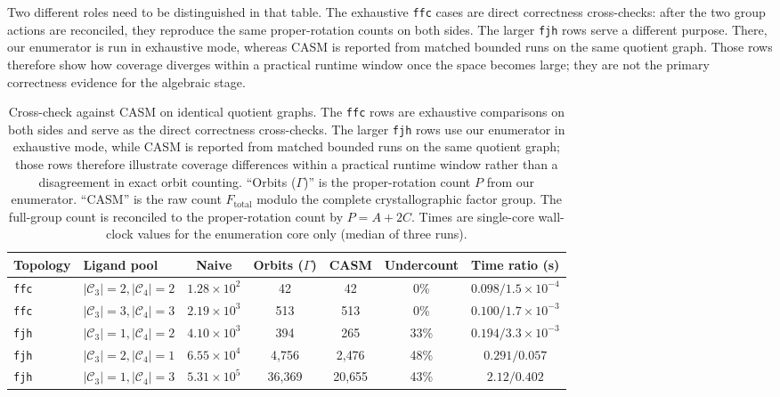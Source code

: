 \documentclass[pdflatex,sn-mathphys-num]{sn-jnl}
\theoremstyle{thmstyleone}%
\begin{document}
Two different roles need to be distinguished in that table. The exhaustive \texttt{ffc} cases are direct correctness cross-checks: after the two group actions are reconciled, they reproduce the same proper-rotation counts on both sides. The larger \texttt{fjh} rows serve a different purpose. There, our enumerator is run in exhaustive mode, whereas CASM is reported from matched bounded runs on the same quotient graph. Those rows therefore show how coverage diverges within a practical runtime window once the space becomes large; they are not the primary correctness evidence for the algebraic stage.

\begin{table}[htbp]
\centering
\scriptsize
\setlength{\tabcolsep}{1.0mm}
\renewcommand{\arraystretch}{1.2}
\caption{Cross-check against CASM on identical quotient graphs. The \texttt{ffc} rows are exhaustive comparisons on both sides and serve as the direct correctness cross-checks. The larger \texttt{fjh} rows use our enumerator in exhaustive mode, while CASM is reported from matched bounded runs on the same quotient graph; those rows therefore illustrate coverage differences within a practical runtime window rather than a disagreement in exact orbit counting. ``Orbits ($\Gamma$)'' is the proper-rotation count $P$ from our enumerator. ``CASM'' is the raw count $F_{\mathrm{total}}$ modulo the complete crystallographic factor group. The full-group count is reconciled to the proper-rotation count by $P=A+2C$. Times are single-core wall-clock values for the enumeration core only (median of three runs).}
\label{tab:casm}
\begin{tabular}{llccccc}
\toprule
\textbf{Topology} & \textbf{Ligand pool} & \textbf{Naive} & \textbf{Orbits ($\Gamma$)} & \textbf{CASM} & \textbf{Undercount} & \textbf{Time ratio (s)} \\
\midrule
\texttt{ffc} & $|\mathcal{C}_3|{=}2,|\mathcal{C}_4|{=}2$ & $1.28\times10^{2}$ & 42      & 42      & 0\%  & $0.098 / 1.5\!\times\!10^{-4}$ \\
\texttt{ffc} & $|\mathcal{C}_3|{=}3,|\mathcal{C}_4|{=}3$ & $2.19\times10^{3}$ & 513     & 513     & 0\%  & $0.100 / 1.7\!\times\!10^{-3}$ \\
\midrule
\texttt{fjh} & $|\mathcal{C}_3|{=}1,|\mathcal{C}_4|{=}2$ & $4.10\times10^{3}$ & 394     & 265     & 33\% & $0.194 / 3.3\!\times\!10^{-3}$ \\
\texttt{fjh} & $|\mathcal{C}_3|{=}2,|\mathcal{C}_4|{=}1$ & $6.55\times10^{4}$ & 4{,}756 & 2{,}476 & 48\% & $0.291 / 0.057$ \\
\texttt{fjh} & $|\mathcal{C}_3|{=}1,|\mathcal{C}_4|{=}3$ & $5.31\times10^{5}$ & 36{,}369& 20{,}655& 43\% & $2.12 / 0.402$ \\
\bottomrule
\end{tabular}
\end{table}
\end{document}
